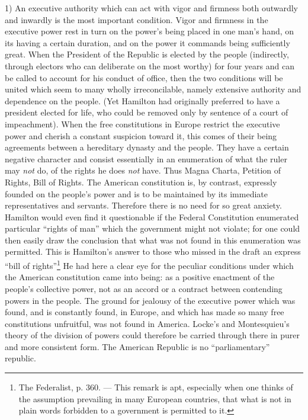 \documentclass[12pt,a4paper,openany]{book}
\newcommand{\opage}[1]{\marginnote{\footnotesize\textit{[#1]}}}
\begin{document}
1) An executive authority which can act with vigor
and firmness both outwardly and inwardly is the most important
condition. Vigor and firmness in the executive power rest
in turn on the power's being placed in one man's hand, on its having
a certain duration, and on the power it commands being
sufficiently great. When the President of the Republic is elected by
the people (indirectly, through electors who can deliberate on
the most worthy) for four years and can be called to account
for his conduct of office, then the two conditions will be
united which seem to many wholly irreconcilable, namely extensive
authority and dependence %
on the people. (Yet Hamilton had
originally preferred to have a president elected for life,
who could be removed only by sentence of a court of impeachment). When the
free constitutions in Europe restrict the executive power
and cherish a constant suspicion toward it, this comes of
their being agreements between a hereditary dynasty and
the people. They have a certain negative character and consist
essentially in an enumeration of what the ruler may \emph{not} do, of the
rights he does \emph{not} have. Thus Magna Charta, Petition
of Rights, Bill of Rights. The American constitution is,
by contrast, expressly founded on the people's power and is to be maintained
by its immediate representatives and servants. Therefore
there is no need for so great anxiety. Hamilton would even
find it questionable if the Federal Constitution enumerated
particular ``rights of man'' which the government might not
violate; for one could then easily draw the conclusion that what
was not found in this enumeration was permitted. This is
Hamilton's answer to those who missed in the draft an express
``bill of rights''\footnote{The Federalist, p. 360. --- This remark is apt, especially
when one thinks of the assumption prevailing in many European countries, that what is not in plain words forbidden to a government
is permitted to it.} He had here a clear eye for the
\opage{137}peculiar conditions under which the American
constitution came into being: as a positive enactment of the people's collective
power, not as an accord or a contract between contending
powers in the people. The ground for jealousy of the
executive power which was found, and is constantly found, in Europe, and which
has made so many free constitutions unfruitful, was not found in
America. Locke's and Montesquieu's theory of the division of powers
could therefore be carried through there in purer and more consistent form.
The American Republic is no ``parliamentary'' republic.
\end{document}
